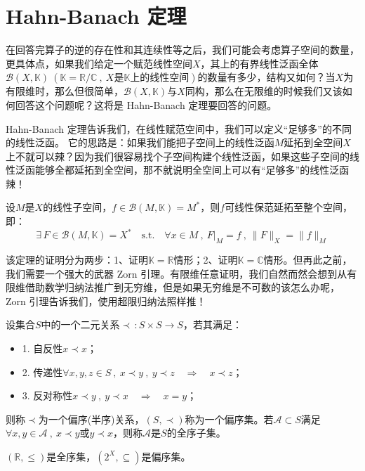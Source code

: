 \section{Hahn-Banach 定理}
在回答完算子的逆的存在性和其连续性等之后，我们可能会考虑算子空间的数量，更具体点，如果我们给定一个赋范线性空间$X$，其上的有界线性泛函全体$\mathscr{B}(X,\mathbb{K}) \ (\mathbb{K}=\mathbb{R}/\mathbb{C} \ , \ X\text{是}\mathbb{K}\text{上的线性空间})$的数量有多少，结构又如何？当$X$为有限维时，那么但很简单，$\mathscr{B}(X,\mathbb{K})$与$X$同构，那么在无限维的时候我们又该如何回答这个问题呢？这将是 Hahn-Banach 定理要回答的问题。

Hahn-Banach 定理告诉我们，在线性赋范空间中，我们可以定义“足够多”的不同的线性泛函。
它的思路是：如果我们能把子空间上的线性泛函$M$延拓到全空间$X$上不就可以辣？因为我们很容易找个子空间构建个线性泛函，如果这些子空间的线性泛函能够全都延拓到全空间，那不就说明全空间上可以有“足够多”的线性泛函辣！
\begin{theorem}\label{HB}
设$M$是$X$的线性子空间，$f \in \mathscr{B}(M,\mathbb{K})=M^*$，则$f$可线性保范延拓至整个空间，即：
\[\exists \, F \in \mathscr{B}(M,\mathbb{K})=X^* \quad \text{s.t.} \quad \forall x \in M \ , \ F|_M=f \ , \ \|F\|_X=\|f\|_M\]
\end{theorem} 
该定理的证明分为两步：1、证明$\mathbb{K}=\mathbb{R}$情形；2、证明$\mathbb{K}=\mathbb{C}$情形。但再此之前，我们需要一个强大的武器 Zorn 引理。有限维任意证明，我们自然而然会想到从有限维借助数学归纳法推广到无穷维，但是如果无穷维是不可数的该怎么办呢，Zorn 引理告诉我们，使用超限归纳法照样推！
\begin{definition}[偏序(半序)关系]
设集合$S$中的一个二元关系$\prec \, :S \times S \to S$，若其满足：
\begin{itemize}
    \item 1. 自反性$x \prec x$；
    \item 2. 传递性$\forall x,y,z \in S \ , \ x \prec y \ , \ y \prec z \quad \Rightarrow \quad x \prec z$；
    \item 3. 反对称性$x \prec y \ , \ y \prec x \quad \Rightarrow \quad x=y$；
\end{itemize}
则称$\prec$为一个偏序(半序)关系，$(S,\prec)$称为一个偏序集。若$\mathscr{A} \subset S$满足$\forall x,y \in \mathscr{A} \ , \ x \prec y$或$y \prec x$，则称$\mathscr{A}$是$S$的全序子集。
\end{definition}
\begin{example}
\quad $(\mathbb{R},\leq)$是全序集，$(2^X,\subseteq)$是偏序集。
\end{example}
